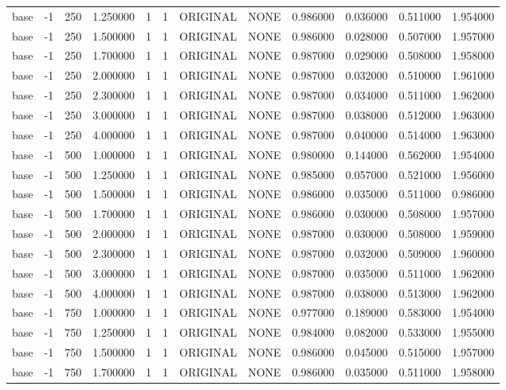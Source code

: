 \begin{tabular}{lrrrllllrrrr}
base & -1 & 250 & 1.250000 & 1 & 1 & ORIGINAL & NONE & 0.986000 & 0.036000 & 0.511000 & 1.954000 \\
base & -1 & 250 & 1.500000 & 1 & 1 & ORIGINAL & NONE & 0.986000 & 0.028000 & 0.507000 & 1.957000 \\
base & -1 & 250 & 1.700000 & 1 & 1 & ORIGINAL & NONE & 0.987000 & 0.029000 & 0.508000 & 1.958000 \\
base & -1 & 250 & 2.000000 & 1 & 1 & ORIGINAL & NONE & 0.987000 & 0.032000 & 0.510000 & 1.961000 \\
base & -1 & 250 & 2.300000 & 1 & 1 & ORIGINAL & NONE & 0.987000 & 0.034000 & 0.511000 & 1.962000 \\
base & -1 & 250 & 3.000000 & 1 & 1 & ORIGINAL & NONE & 0.987000 & 0.038000 & 0.512000 & 1.963000 \\
base & -1 & 250 & 4.000000 & 1 & 1 & ORIGINAL & NONE & 0.987000 & 0.040000 & 0.514000 & 1.963000 \\
base & -1 & 500 & 1.000000 & 1 & 1 & ORIGINAL & NONE & 0.980000 & 0.144000 & 0.562000 & 1.954000 \\
base & -1 & 500 & 1.250000 & 1 & 1 & ORIGINAL & NONE & 0.985000 & 0.057000 & 0.521000 & 1.956000 \\
base & -1 & 500 & 1.500000 & 1 & 1 & ORIGINAL & NONE & 0.986000 & 0.035000 & 0.511000 & 0.986000 \\
base & -1 & 500 & 1.700000 & 1 & 1 & ORIGINAL & NONE & 0.986000 & 0.030000 & 0.508000 & 1.957000 \\
base & -1 & 500 & 2.000000 & 1 & 1 & ORIGINAL & NONE & 0.987000 & 0.030000 & 0.508000 & 1.959000 \\
base & -1 & 500 & 2.300000 & 1 & 1 & ORIGINAL & NONE & 0.987000 & 0.032000 & 0.509000 & 1.960000 \\
base & -1 & 500 & 3.000000 & 1 & 1 & ORIGINAL & NONE & 0.987000 & 0.035000 & 0.511000 & 1.962000 \\
base & -1 & 500 & 4.000000 & 1 & 1 & ORIGINAL & NONE & 0.987000 & 0.038000 & 0.513000 & 1.962000 \\
base & -1 & 750 & 1.000000 & 1 & 1 & ORIGINAL & NONE & 0.977000 & 0.189000 & 0.583000 & 1.954000 \\
base & -1 & 750 & 1.250000 & 1 & 1 & ORIGINAL & NONE & 0.984000 & 0.082000 & 0.533000 & 1.955000 \\
base & -1 & 750 & 1.500000 & 1 & 1 & ORIGINAL & NONE & 0.986000 & 0.045000 & 0.515000 & 1.957000 \\
base & -1 & 750 & 1.700000 & 1 & 1 & ORIGINAL & NONE & 0.986000 & 0.035000 & 0.511000 & 1.958000 \\

\end{tabular}
